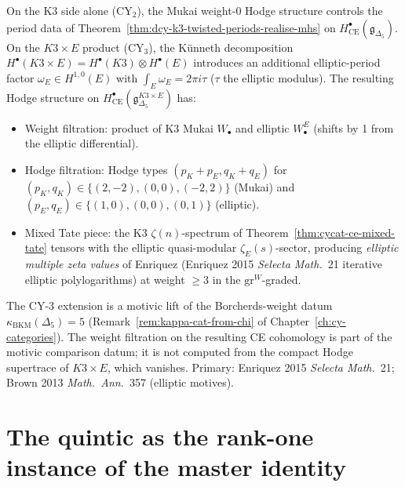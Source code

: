 \begin{remark}
\label{rem:dcy-k3-vs-k3e-hodge-comparison}
On the K3 side alone (CY$_2$), the Mukai weight-$0$ Hodge structure
controls the period data of Theorem~\textup{\ref{thm:dcy-k3-twisted-periods-realise-mhs}}
on $H^\bullet_{\mathrm{CE}}(\mathfrak{g}_{\Delta_5})$. On the
$K3 \times E$ product (CY$_3$), the K\"unneth decomposition
$H^\bullet(K3 \times E) = H^\bullet(K3) \otimes H^\bullet(E)$
introduces an additional elliptic-period factor
$\omega_E \in H^{1,0}(E)$ with $\int_E \omega_E = 2\pi i \tau$
($\tau$ the elliptic modulus). The resulting Hodge structure on
$H^\bullet_{\mathrm{CE}}(\mathfrak{g}_{\Delta_5}^{K3\times E})$ has:
\begin{itemize}
 \item Weight filtration: product of K3 Mukai $W_\bullet$ and
 elliptic $W_\bullet^E$ (shifts by 1 from the elliptic differential).
 \item Hodge filtration: Hodge types $(p_K + p_E, q_K + q_E)$ for
 $(p_K, q_K) \in \{(2,-2), (0,0), (-2,2)\}$ (Mukai) and
 $(p_E, q_E) \in \{(1,0), (0,0), (0,1)\}$ (elliptic).
 \item Mixed Tate piece: the K3 $\zeta(n)$-spectrum of
 Theorem~\textup{\ref{thm:cycat-ce-mixed-tate}} tensors with the
 elliptic quasi-modular $\zeta_E(s)$-sector, producing
 \emph{elliptic multiple zeta values} of Enriquez (Enriquez 2015
 \emph{Selecta Math.}~21 iterative elliptic polylogarithms) at
 weight $\geq 3$ in the $\mathrm{gr}^W$-graded.
\end{itemize}
The CY-3 extension is a motivic lift of the Borcherds-weight datum
$\kappa_{\mathrm{BKM}}(\Delta_5) = 5$
(Remark~\textup{\ref{rem:kappa-cat-from-chi}} of
Chapter~\textup{\ref{ch:cy-categories}}). The weight filtration on
the resulting CE cohomology is part of the motivic comparison datum;
it is not computed from the compact Hodge supertrace of
$K3 \times E$, which vanishes. Primary: Enriquez 2015 \emph{Selecta Math.}~21;
Brown 2013 \emph{Math.\ Ann.}~357 (elliptic motives).
\end{remark}

\section{The quintic as the rank-one instance of the master identity}
\label{sec:bl-quintic-deployment}

